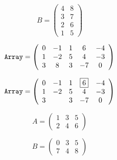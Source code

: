 \documentclass{article}
\begin{document}
{\newpage
\clearpage
\samepage \begin{displaymath}B = \left( \begin{array}{cc}
           4 & 8   \\  
           3 & 7   \\  
           2 & 6   \\  
           1 & 5 
\end{array}\right)\end{displaymath}
}

{\newpage
\clearpage
\samepage \begin{displaymath}\mbox{\tt Array} =  
         \left(
\begin{array}{ccccc}
         0 &  -1 &  1 &  6 &  -4 \\  
         1 &  -2 &  5 &  4 &  -3 \\  
         3 &   8 &  3 & -7 &   0
\end{array}
         \right)
\end{displaymath}
}

{\newpage
\clearpage
\samepage \begin{displaymath}\mbox{\tt Array} =
         \left(
\begin{array}{ccccc}
         0 &  -1 &  1 &  \fbox{6} &  -4 \\  
         1 &  -2 &  5 &  4 &  -3 \\  
         3 &     &  3 & -7 &   0
\end{array}
         \right)
\end{displaymath}
}

{\newpage
\clearpage
\samepage \begin{displaymath}A = \left(\begin{array}{ccc}
 1 & 3 & 5 \\  
 2 & 4 & 6
\end{array}\right)\end{displaymath}
}

{\newpage
\clearpage
\samepage \begin{displaymath}B = \left( \begin{array}{ccc}
 0 & 3 & 5 \\  
 7 & 4 & 8 
\end{array}\right)\end{displaymath}
}

{\newpage
\clearpage
\samepage {}
}
\end{document}
